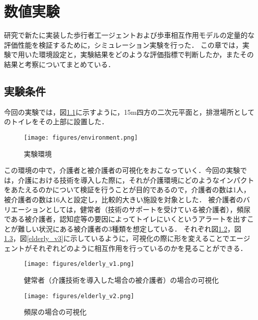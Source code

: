 \chapter{数値実験}

研究で新たに実装した歩行者工一ジェントおよび歩車相互作用モデルの定量的な評価性能を検証するために，シミュレーション実験を行った．
この章では，実験で用いた環境設定と，実験結果をどのような評価指標で判断したか，またその結果と考察についてまとめている．

\section{実験条件}

今回の実験では，図\ref{environment}に示すように，15m四方の二次元平面と，排泄場所としてのトイレをその上部に設置した．

\begin{figure}[htb]
\begin{center}
 \texttt{[image: figures/environment.png]}
 \caption[実験環境]{実験環境 \label{environment}}
\end{center}
\end{figure}

この環境の中で，介護者と被介護者の可視化をおこなっていく．今回の実験では，介護における技術を導入した際に，それが介護環境にどのようなインパクトをあたえるのかについて検証を行うことが目的であるので，介護者の数は1人，被介護者の数は16人と設定し，比較的大きい施設を対象とした．
被介護者のバリエーションとしては，健常者（技術のサポートを受けている被介護者），頻尿である被介護者，認知症等の要因によってトイレにいくというアラートを出すことが難しい状況にある被介護者の3種類を想定している．
それぞれ図\ref{elderly_v1}，図\ref{elderly_v2}，図\ref{elderly_v3}に示しているように，可視化の際に形を変えることでエージェントがそれぞれどのように相互作用を行っているのかを見ることができる．

\begin{figure}[htb]
\begin{center}
 \texttt{[image: figures/elderly\_v1.png]}
 \caption[健常者（介護技術を導入した場合の被介護者）の場合の可視化]{健常者（介護技術を導入した場合の被介護者）の場合の可視化 \label{elderly_v1}}
\end{center}
\end{figure}

\begin{figure}[htb]
\begin{center}
 \texttt{[image: figures/elderly\_v2.png]}
 \caption[頻尿の場合の可視化]{頻尿の場合の可視化 \label{elderly_v2}}
\end{center}
\end{figure}


